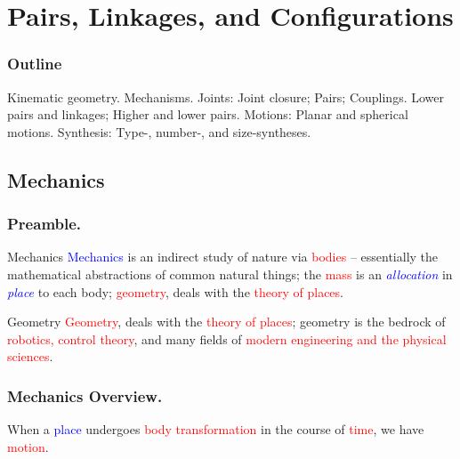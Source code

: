 \section{Pairs, Linkages, and Configurations}

\begin{frame}
	\frametitle{Outline}
	\begin{tcolorbox}[coltitle=white!80,colframe=blue!85,split=.2,title=Mechanism Components]
		Kinematic geometry. Mechanisms.
		\tcblower
		Joints: Joint closure; Pairs; Couplings.
		\vspace{.2cm}
		\newline
		Lower pairs and linkages; Higher and lower pairs.
		\vspace{.2cm}
		\newline
		Motions: Planar and spherical motions.
		\vspace{.2cm}
		\newline
		Synthesis: Type-, number-, and size-syntheses.
	\end{tcolorbox}
\end{frame}

\subsection{Mechanics}
\begin{frame}
	\frametitle{Preamble.}
	\begin{block}{Mechanics}
		\textcolor{blue}{Mechanics} is an indirect study of nature via \textcolor{red}{bodies} --  essentially the mathematical abstractions of common natural things; the \textcolor{red}{mass} is an \textcolor{blue}{\textit{allocation}} in \textcolor{blue}{\textit{place}} to each body; \textcolor{red}{geometry}, deals with the \textcolor{red}{theory of places}.
	\end{block}

	\begin{block}{Geometry}
		 \textcolor{red}{Geometry}, deals with the \textcolor{red}{theory of places}; geometry is the bedrock of \textcolor{red}{robotics, control theory}, and many fields of \textcolor{red}{modern engineering and the physical sciences}.
\end{block}
\end{frame}

\begin{frame}
	\frametitle{Mechanics Overview.}
	\begin{definition}[Motion]
		When a  \textcolor{blue}{place} undergoes \textcolor{red}{body transformation} in the course of  \textcolor{red}{time}, we have \textcolor{red}{motion}.
	\end{definition}
\end{frame}


